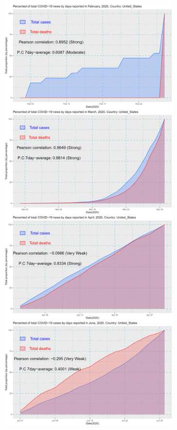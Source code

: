 \documentclass[a4paper]{article}
\theoremstyle{definition}
\begin{document}
\begin{enumerate}[i)]
\begin{enumerate}[1)]
\begin{figure}[H]
				\includegraphics[height=23cm,width=13cm]{images/9.5.png}
			\end{figure}
			\begin{figure}[H]
				\centering

\end{figure}
\end{enumerate}
\end{enumerate}
\end{document}

